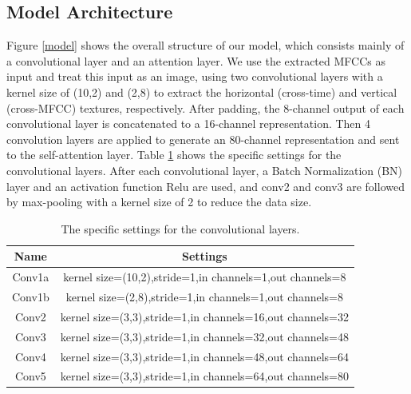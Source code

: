 \documentclass[10pt, conference, compsocconf]{IEEEtran}
\begin{document}
\subsection{Model Architecture}
Figure \ref{model} shows the overall structure of our model, which consists mainly of a convolutional layer and an attention layer.
We use the extracted MFCCs as input and treat this input as an image, using two convolutional layers with a kernel size of (10,2) and (2,8) to extract the horizontal (cross-time) and vertical (cross-MFCC) textures, respectively. After padding, the 8-channel output of each convolutional layer is concatenated to a 16-channel representation. Then 4 convolution layers are applied to generate an 80-channel representation and sent to the self-attention layer. 
Table \ref{ConvSettings} shows the specific settings for the convolutional layers. After each convolutional layer, a Batch Normalization (BN) layer and an activation function Relu are used, and conv2 and conv3 are followed by max-pooling with a kernel size of 2 to reduce the data size.
\begin{table}[h]
	\renewcommand\arraystretch{1.5}
	\setlength{\abovecaptionskip}{-0.2cm}
	\caption{The specific settings for the convolutional layers.}
	\label{ConvSettings}
	\begin{center}  
		\begin{tabular}{|c|c|} 
			\hline  
			Name & Settings \\   
			\hline  
			Conv1a & kernel size=(10,2),stride=1,in channels=1,out channels=8\\   
			\hline
			Conv1b & kernel size=(2,8),stride=1,in channels=1,out channels=8 \\   
			\hline
			Conv2 & kernel size=(3,3),stride=1,in channels=16,out channels=32 \\   
			\hline
			Conv3 & kernel size=(3,3),stride=1,in channels=32,out channels=48 \\   
			\hline
			Conv4 & kernel size=(3,3),stride=1,in channels=48,out channels=64 \\   
			\hline
			Conv5 & kernel size=(3,3),stride=1,in channels=64,out channels=80 \\   
			\hline
		\end{tabular}  
	\end{center}  
\end{table}
\end{document}
